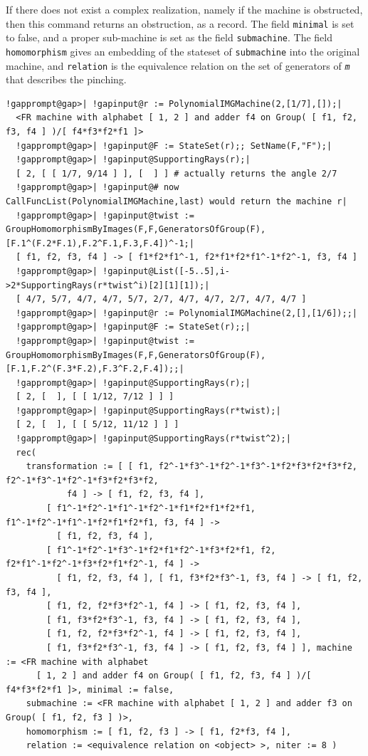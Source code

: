 \documentclass[a4paper,11pt]{report}
\begin{document}
{{{ If there does not exist a complex realization, namely if the machine is
obstructed, then this command returns an obstruction, as a record. The field \texttt{minimal} is set to false, and a proper sub-machine is set as the field \texttt{submachine}. The field \texttt{homomorphism} gives an embedding of the stateset of \texttt{submachine} into the original machine, and \texttt{relation} is the equivalence relation on the set of generators of \mbox{\texttt{\mdseries\slshape m}} that describes the pinching. 
\begin{Verbatim}[commandchars=!@|,fontsize=\small,frame=single,label=Example]
  !gapprompt@gap>| !gapinput@r := PolynomialIMGMachine(2,[1/7],[]);|
  <FR machine with alphabet [ 1, 2 ] and adder f4 on Group( [ f1, f2, f3, f4 ] )/[ f4*f3*f2*f1 ]>
  !gapprompt@gap>| !gapinput@F := StateSet(r);; SetName(F,"F");|
  !gapprompt@gap>| !gapinput@SupportingRays(r);|
  [ 2, [ [ 1/7, 9/14 ] ], [  ] ] # actually returns the angle 2/7
  !gapprompt@gap>| !gapinput@# now CallFuncList(PolynomialIMGMachine,last) would return the machine r|
  !gapprompt@gap>| !gapinput@twist := GroupHomomorphismByImages(F,F,GeneratorsOfGroup(F),[F.1^(F.2*F.1),F.2^F.1,F.3,F.4])^-1;|
  [ f1, f2, f3, f4 ] -> [ f1*f2*f1^-1, f2*f1*f2*f1^-1*f2^-1, f3, f4 ]
  !gapprompt@gap>| !gapinput@List([-5..5],i->2*SupportingRays(r*twist^i)[2][1][1]);|
  [ 4/7, 5/7, 4/7, 4/7, 5/7, 2/7, 4/7, 4/7, 2/7, 4/7, 4/7 ]
  !gapprompt@gap>| !gapinput@r := PolynomialIMGMachine(2,[],[1/6]);;|
  !gapprompt@gap>| !gapinput@F := StateSet(r);;|
  !gapprompt@gap>| !gapinput@twist := GroupHomomorphismByImages(F,F,GeneratorsOfGroup(F),[F.1,F.2^(F.3*F.2),F.3^F.2,F.4]);;|
  !gapprompt@gap>| !gapinput@SupportingRays(r);|
  [ 2, [  ], [ [ 1/12, 7/12 ] ] ]
  !gapprompt@gap>| !gapinput@SupportingRays(r*twist);|
  [ 2, [  ], [ [ 5/12, 11/12 ] ] ]
  !gapprompt@gap>| !gapinput@SupportingRays(r*twist^2);|
  rec(
    transformation := [ [ f1, f2^-1*f3^-1*f2^-1*f3^-1*f2*f3*f2*f3*f2, f2^-1*f3^-1*f2^-1*f3*f2*f3*f2,
            f4 ] -> [ f1, f2, f3, f4 ],
        [ f1^-1*f2^-1*f1^-1*f2^-1*f1*f2*f1*f2*f1, f1^-1*f2^-1*f1^-1*f2*f1*f2*f1, f3, f4 ] ->
          [ f1, f2, f3, f4 ],
        [ f1^-1*f2^-1*f3^-1*f2*f1*f2^-1*f3*f2*f1, f2, f2*f1^-1*f2^-1*f3*f2*f1*f2^-1, f4 ] ->
          [ f1, f2, f3, f4 ], [ f1, f3*f2*f3^-1, f3, f4 ] -> [ f1, f2, f3, f4 ],
        [ f1, f2, f2*f3*f2^-1, f4 ] -> [ f1, f2, f3, f4 ],
        [ f1, f3*f2*f3^-1, f3, f4 ] -> [ f1, f2, f3, f4 ],
        [ f1, f2, f2*f3*f2^-1, f4 ] -> [ f1, f2, f3, f4 ],
        [ f1, f3*f2*f3^-1, f3, f4 ] -> [ f1, f2, f3, f4 ] ], machine := <FR machine with alphabet
      [ 1, 2 ] and adder f4 on Group( [ f1, f2, f3, f4 ] )/[ f4*f3*f2*f1 ]>, minimal := false,
    submachine := <FR machine with alphabet [ 1, 2 ] and adder f3 on Group( [ f1, f2, f3 ] )>,
    homomorphism := [ f1, f2, f3 ] -> [ f1, f2*f3, f4 ],
    relation := <equivalence relation on <object> >, niter := 8 )
\end{Verbatim}
 }

}}
\end{document}
